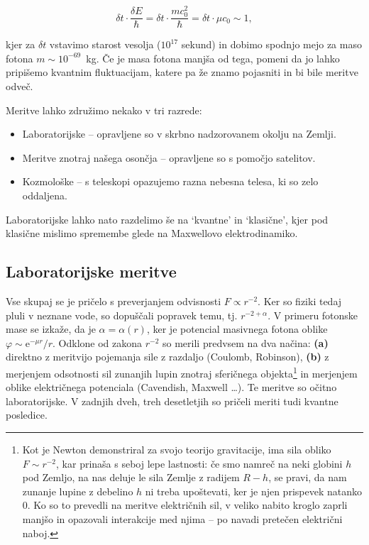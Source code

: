 \documentclass[a4paper, twocolumn, titlepage]{article}
\begin{document}
\begin{equation}
	\delta t \cdot \frac{\delta E}{\hbar} = \delta t \cdot \frac{mc_0^2}{\hbar} = \delta t \cdot \mu c_0 \sim 1,
\end{equation}

kjer za $\delta t$ vstavimo starost vesolja ($10^{17}$ sekund) in dobimo spodnjo mejo za maso fotona \hbox{$m \sim
10^{-69}$ kg}.
\v Ce je masa fotona manj\v sa od tega, pomeni da jo lahko pripi\v semo kvantnim fluktuacijam, katere pa \v ze znamo
pojasniti in bi bile meritve odve\v c.

Meritve lahko združimo nekako v tri razrede:
\begin{itemize}
	\item{Laboratorijske -- opravljene so v skrbno nadzorovanem okolju na Zemlji.}
	\item{Meritve znotraj na\v sega oson\v cja -- opravljene so s pomočjo satelitov.}
	\item{Kozmološke -- s teleskopi opazujemo razna nebesna telesa, ki so zelo oddaljena.}
\end{itemize}

Laboratorijske lahko nato razdelimo še na `kvantne' in `klasične', kjer pod klasične mislimo spremembe glede na Maxwellovo
elektrodinamiko.

\subsection{Laboratorijske meritve}

Vse skupaj se je pričelo s preverjanjem odvisnosti $F \propto r^{-2}$. Ker so fiziki tedaj pluli v neznane vode, so dopuščali
popravek temu, tj. $r^{-2 + \alpha}$. V primeru fotonske mase se izkaže, da je $\alpha = \alpha (r)$, ker je potencial masivnega
fotona oblike $\varphi \sim \text{e}^{-\mu r}/r$. Odklone od zakona $r^{-2}$ so merili predvsem na dva načina: \textbf{(a)} direktno
z meritvijo pojemanja sile z razdaljo (Coulomb, Robinson), \textbf{(b)} z merjenjem odsotnosti sil zunanjih lupin znotraj
sferičnega objekta\footnote{Kot je Newton demonstriral za svojo teorijo gravitacije, ima sila obliko $F \sim r^{-2}$, kar prinaša s
seboj lepe lastnosti: če smo namreč na neki globini $h$ pod Zemljo, na nas deluje le sila Zemlje z radijem $R - h$, se pravi, da
nam zunanje lupine z debelino $h$ ni treba upoštevati, ker je njen prispevek natanko 0. Ko so to prevedli na meritve električnih
sil, v veliko nabito kroglo zaprli manjšo in opazovali interakcije med njima -- po navadi pretečen električni naboj.} in
merjenjem oblike električnega potenciala (Cavendish, Maxwell \ldots). Te meritve so očitno laboratorijske. V zadnjih dveh, treh
desetletjih so pričeli meriti tudi kvantne posledice.
\end{document}
